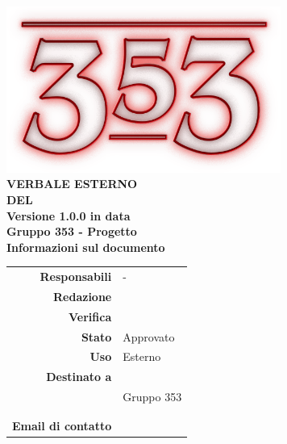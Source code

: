 \documentclass[openany, a4paper, 12pt]{report}
\begin{document}
\begin{titlepage}
	\centering
	\vfill
	{
		\bfseries
		\vskip2cm
		\includegraphics[width=9cm]{../../common/images/logo.png} \\
		\vfill
		\Huge{VERBALE ESTERNO\\DEL {}}\\
		\vfill
		\Large Versione 1.0.0 in data \\
		\large Gruppo 353 - Progetto \progetto \\
		\vfill
		\normalsize Informazioni sul documento\\
		\begin{table}[htbp]
			\centering
			\renewcommand\arraystretch{1.2}
			\begin{tabular}{r|l}
				\hline
				\textbf{Responsabili}	& -\\
				
				\textbf{Redazione} 		& \Elena \\
				\textbf{Verifica} 		& \Mirco \\	
				
				\textbf{Stato} 			& Approvato\\
				\textbf{Uso}			& Esterno\\
				\textbf{Destinato a}   	& \Proponente\\
										& Gruppo 353\\
										& \Vardanega\\
										& \Cardin\\

				\textbf{Email di contatto}	& \mailgroup
			\end{tabular}
		\end{table}
		\vfill 
	}    
\end{titlepage}
\newpage
{}

 
\end{document}
